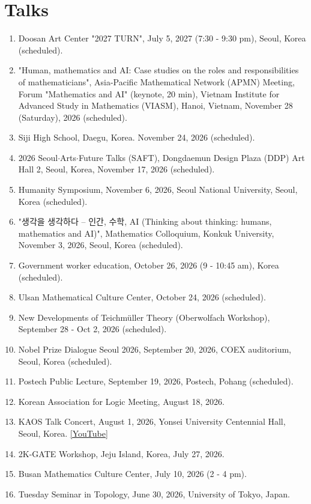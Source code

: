 \documentclass[11pt,a4paper]{article}
\begin{document}
\section*{Talks}
\begin{enumerate}[leftmargin=1.5em, label=\arabic*.]
\item Doosan Art Center "2027 TURN", July 5, 2027 (7:30 - 9:30 pm), Seoul, Korea (scheduled).
\item "Human, mathematics and AI: Case studies on the roles and responsibilities of mathematicians", Asia-Pacific Mathematical Network (APMN) Meeting, Forum "Mathematics and AI" (keynote, 20 min), Vietnam Institute for Advanced Study in Mathematics (VIASM), Hanoi, Vietnam, November 28 (Saturday), 2026 (scheduled).
\item Siji High School, Daegu, Korea. November 24, 2026 (scheduled).
\item 2026 Seoul$\cdot$Arts$\cdot$Future Talks (SAFT), Dongdaemun Design Plaza (DDP) Art Hall 2, Seoul, Korea, November 17, 2026 (scheduled).
\item Humanity Symposium, November 6, 2026, Seoul National University, Seoul, Korea (scheduled).
\item "생각을 생각하다 -- 인간, 수학, AI (Thinking about thinking: humans, mathematics and AI)", Mathematics Colloquium, Konkuk University, November 3, 2026, Seoul, Korea (scheduled).
\item Government worker education, October 26, 2026 (9 - 10:45 am), Korea (scheduled).
\item Ulsan Mathematical Culture Center, October 24, 2026 (scheduled).
\item New Developments of Teichmüller Theory (Oberwolfach Workshop), September 28 - Oct 2, 2026 (scheduled).
\item Nobel Prize Dialogue Seoul 2026, September 20, 2026, COEX auditorium, Seoul, Korea (scheduled).
\item Postech Public Lecture, September 19, 2026, Postech, Pohang (scheduled).
\item Korean Association for Logic Meeting, August 18, 2026.
\item KAOS Talk Concert, August 1, 2026, Yonsei University Centennial Hall, Seoul, Korea. \href{https://youtu.be/NSLR6f_R9iA?si=Yl-nXGFkB4_IXiLs}{[YouTube]}
\item 2K-GATE Workshop, Jeju Island, Korea, July 27, 2026.
\item Busan Mathematics Culture Center, July 10, 2026 (2 - 4 pm).
\item Tuesday Seminar in Topology, June 30, 2026, University of Tokyo, Japan.

\end{enumerate}
\end{document}

